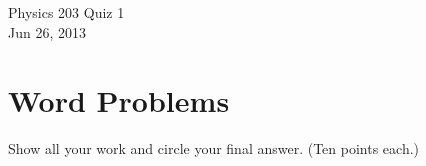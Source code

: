 \documentclass{article}
\begin{document}
\setcounter{page}{1}


\begin{center}
\LARGE{Physics 203 Quiz 1} \\[2mm]
\small{\sf Jun 26, 2013}
\end{center}

\thispagestyle{empty}

\section*{Word Problems}
Show all your work and circle your final answer. (Ten points each.) \par
\end{document}
